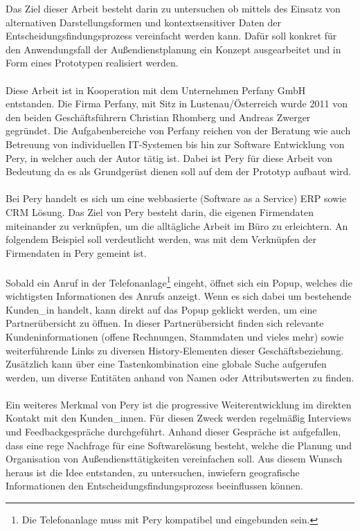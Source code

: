 \documentclass[Bachelorarbeit.tex]{subfiles}
\begin{document}
Das Ziel dieser Arbeit besteht darin zu untersuchen ob mittels des Einsatz von alternativen Darstellungsformen und kontextsensitiver Daten der Entscheidungsfindungsprozess vereinfacht werden kann. 
Dafür soll konkret für den Anwendungsfall der Außendienstplanung ein Konzept ausgearbeitet und in Form eines Prototypen realisiert werden. \\
\\
Diese Arbeit ist in Kooperation mit dem Unternehmen Perfany GmbH entstanden.
Die Firma Perfany, mit Sitz in Lustenau/Österreich wurde 2011 von den beiden Geschäftsführern Christian Rhomberg und Andreas Zwerger gegründet.
Die Aufgabenbereiche von Perfany reichen von der Beratung wie auch Betreuung von individuellen IT-Systemen bis hin zur Software Entwicklung von Pery, in welcher auch der Autor tätig ist. 
Dabei ist Pery für diese Arbeit von Bedeutung da es als Grundgerüst dienen soll auf dem der Prototyp aufbaut wird.\\
\\
Bei Pery handelt es sich um eine webbasierte (Software as a Service) \ac{ERP} sowie \ac{CRM} Lösung.
Das Ziel von Pery besteht darin, die eigenen Firmendaten miteinander zu verknüpfen, um die alltägliche Arbeit im Büro zu erleichtern.
An folgendem Beispiel soll verdeutlicht werden, was mit dem Verknüpfen der Firmendaten in Pery gemeint ist.\\
\\
Sobald ein Anruf in der Telefonanlage\footnote{Die Telefonanlage muss mit Pery kompatibel und eingebunden sein.} eingeht, öffnet sich ein Popup, welches die wichtigsten Informationen des Anrufs anzeigt. 
Wenn es sich dabei um bestehende Kunden\_in handelt, kann direkt auf das Popup geklickt werden, um eine Partnerübersicht zu öffnen.
In dieser Partnerübersicht finden sich relevante Kundeninformationen (offene Rechnungen, Stammdaten und vieles mehr) sowie weiterführende Links zu diversen History-Elementen dieser Geschäftsbeziehung.
Zusätzlich kann über eine Tastenkombination eine globale Suche aufgerufen werden, um diverse Entitäten anhand von Namen oder Attributswerten zu finden. \\
\\
Ein weiteres Merkmal von Pery ist die progressive Weiterentwicklung im direkten Kontakt mit den Kunden\_innen.
Für diesen Zweck werden regelmäßig Interviews und Feedbackgespräche durchgeführt.
Anhand dieser Gespräche ist aufgefallen, dass eine rege Nachfrage für eine Softwarelösung besteht, welche die Planung und Organisation von Außendiensttätigkeiten vereinfachen soll.
Aus diesem Wunsch heraus ist die Idee entstanden, zu untersuchen, inwiefern geografische Informationen den Entscheidungsfindungsprozess beeinflussen können.
\end{document}
